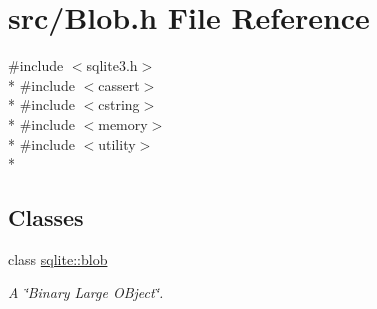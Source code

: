 \hypertarget{a00020}{\section{src/\-Blob.h File Reference}
\label{a00020}
}
{\ttfamily \#include $<$sqlite3.\-h$>$}\\*
{\ttfamily \#include $<$cassert$>$}\\*
{\ttfamily \#include $<$cstring$>$}\\*
{\ttfamily \#include $<$memory$>$}\\*
{\ttfamily \#include $<$utility$>$}\\*
\subsection*{Classes}
\begin{DoxyCompactItemize}
\item 
class \hyperlink{a00002}{sqlite\-::blob}
\begin{DoxyCompactList}\small\item\em A \char`\"{}\-Binary Large O\-Bject\char`\"{}. \end{DoxyCompactList}\end{DoxyCompactItemize}
